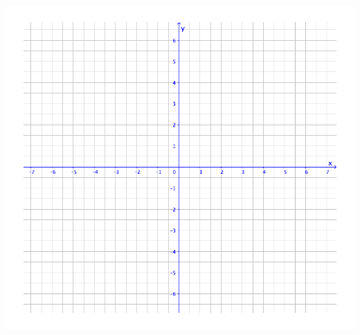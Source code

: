 \documentclass[a4paper,11pt]{report}
\begin{document}
\begin{center}
\includegraphics[width=1\textwidth]{media/FA-30/axesvides1.pdf}
\end{center}
\end{document}
